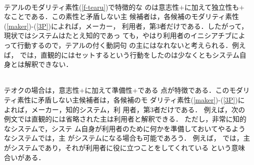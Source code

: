 {\\テ\hspace*{-0.2mm}アルのモ\hspace*{-0.2mm}ダ\hspace*{-0.2mm}リ\hspace*{-0.2mm}テ\hspace*{-0.3mm}ィ\hspace*{-0.2mm}素性(\ref{f-tearu})で特徴的な
のは意志性\hspace*{-0.05mm}$+$\hspace*{-0.05mm}に加えて独立性も\hspace*{-0.05mm}$+$\hspace*{-0.05mm}な\hspace*{-0.2mm}こ\hspace*{-0.2mm}とである．\hspace*{-0.5mm}この素性と矛盾しない{\dg 主}
候補者は，各候補のモダリティ素性(\ref{maker})-(\ref{3P})によれば，メーカー，
利用者，第3者だけである．したがって，現状ではシステムはたとえ知的であっ
ても，やはり利用者のイニシアチブによって行動するので，テアルの付く動詞句
の{\dg 主}にはなれないと考えられる．例えば，
では，直観的にはセットするという行動をしたのは少なくともシステム自身とは解釈できない．

\\テオクの場合は，\hspace*{-0.2mm}意志性\hspace*{-0.05mm}$+$\hspace*{-0.05mm}に加えて準備性\hspace*{-0.05mm}$+$\hspace*{-0.05mm}である
点が特徴である．\hspace*{-0.2mm}このモダリティ素性に矛盾しない{\dg 主}候補者は，各候補のモ
ダリティ素性(\ref{maker})-(\ref{3P})によれば，メーカー，知的システム，利
用者，第3者だけである．
例えば，次の例文では直観的には省略された{\dg 主}は利用者と解釈できる．
ただし，非常に知的なシステムで，システ
ム自身が利用者のために何かを準備しておいてやるようなシステムでは，{\dg 主}
がシステムになる場合も可能であろう．
例えば，
では，{\dg 主}がシステムであり，それが利用者に役に立つことをしてくれている
という意味合いがある．

}

